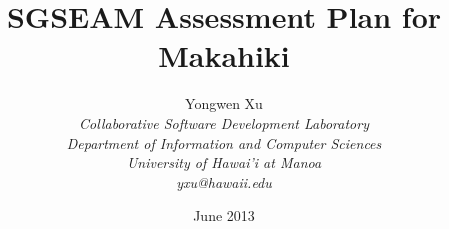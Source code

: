 \documentclass[11pt]{article}
\begin{document}
\title{SGSEAM Assessment Plan for Makahiki}

\author{
	 Yongwen Xu \\
\em  Collaborative Software Development Laboratory \\
\em  Department of Information and Computer Sciences \\
\em  University of Hawai'i at Manoa\\
     yxu@hawaii.edu \\
}

\date{June 2013}
\maketitle

\tableofcontents

\graphicspath{{figures/}} 





\end{document}
